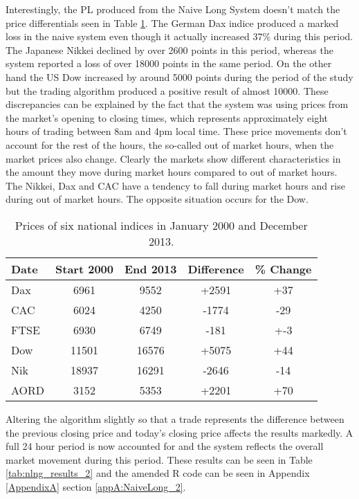 Interestingly, the PL produced from the Naive Long System doesn't match the price differentials seen in Table \ref{tab:ind_start_stop}.  The German Dax indice produced a marked loss in the naive system even though it actually increased 37\% during this period. The Japanese Nikkei declined by over 2600 points in this period, whereas the system reported a loss of over 18000 points in the same period. On the other hand the US Dow increased by around 5000 points during the period of the study but the trading algorithm produced a positive result of almost 10000. These discrepancies can be explained by the fact that the system was using prices from the market's opening to closing times, which represents approximately  eight hours of trading between 8am and 4pm local time. These price movements don't account for the rest of the hours, the so-called out of market hours, when the market prices also change. Clearly the markets show different characteristics in the amount they move during market hours compared to out of market hours. The Nikkei, Dax and CAC have a tendency to fall during market hours and rise during out of market hours. The opposite situation occurs for the Dow.



\begin{table}[!htbp] \centering  
\caption[Indice Prices in 2000 and 2013.]{Prices of six national indices in January 2000 and December 2013.}
\label{tab:ind_start_stop}
\begin{tabular}{lcccc}
\toprule
Date & Start 2000 & End 2013 & Difference & \% Change  \\
\midrule
Dax & 6961 & 9552   & +2591 & +37 \\
CAC & 6024 & 4250   & -1774 & -29 \\
FTSE & 6930 & 6749  & -181  & +-3 \\
Dow & 11501 & 16576 & +5075 & +44 \\
Nik & 18937 & 16291 & -2646 & -14 \\
AORD & 3152 & 5353  & +2201 & +70 \\
\bottomrule
\end{tabular}
\end{table}

Altering the algorithm slightly so that a trade represents the difference between the previous closing price and today's closing price affects the results markedly. A full 24 hour period is now accounted for and the system reflects the overall market movement during this period. These results can be seen in Table \ref{tab:nlng_results_2} and the amended R code can be seen in Appendix \ref{AppendixA} section \ref{appA:NaiveLong_2}.


